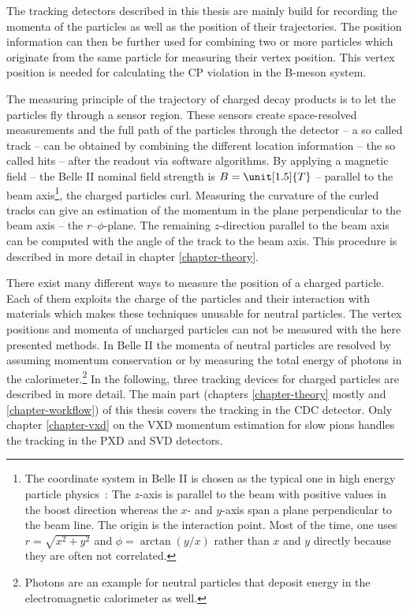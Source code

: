 The tracking detectors described in this thesis are mainly build for recording the momenta of the particles as well as the position of their trajectories. The position information can then be further used for combining two or more particles which originate from the same particle for measuring their vertex position. This vertex position is needed for calculating the CP violation in the B-meson system. %

The measuring principle of the trajectory of charged decay products is to let the particles fly through a sensor region. These sensors create space-resolved measurements and the full path of the particles through the detector -- a so called track -- can be obtained by combining the different location information -- the so called hits -- after the readout via software algorithms. By applying a magnetic field -- the Belle II nominal field strength is $B = \unit[1.5]{T}$ -- parallel to the beam axis\footnote{The coordinate system in Belle II is chosen as the typical one in high energy particle physics~\cite{coordinate}: The $z$-axis is parallel to the beam with positive values in the boost direction whereas the $x$- and $y$-axis span a plane perpendicular to the beam line. The origin is the interaction point. Most of the time, one uses $r = \sqrt{x^2 + y^2}$ and $\phi = \arctan(y/x)$ rather than $x$ and $y$ directly because they are often not correlated.}, the charged particles curl. Measuring the curvature of the curled tracks can give an estimation of the momentum in the plane perpendicular to the beam axis -- the $r$--$\phi$-plane. The remaining $z$-direction parallel to the beam axis can be computed with the angle of the track to the beam axis. This procedure is described in more detail in chapter \ref{chapter-theory}.

There exist many different ways to measure the position of a charged particle. Each of them exploits the charge of the particles and their interaction with materials which makes these techniques unusable for neutral particles. The vertex positions and momenta of uncharged particles can not be measured with the here presented methods. In Belle II the momenta of neutral particles are resolved by assuming momentum conservation or by measuring the total energy of photons in the calorimeter.\footnote{Photons are an example for neutral particles that deposit energy in the electromagnetic calorimeter as well.} In the following, three tracking devices for charged particles are described in more detail. The main part (chapters \ref{chapter-theory} mostly and \ref{chapter-workflow}) of this thesis covers the tracking in the CDC detector. Only chapter \ref{chapter-vxd} on the VXD momentum estimation for slow pions handles the tracking in the PXD and SVD detectors.

